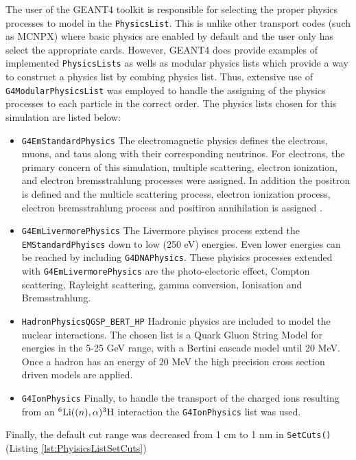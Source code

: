 The user of the GEANT4 toolkit is responsible for selecting the proper physics processes to model in the \verb+PhysicsList+.
This is unlike other transport codes (such as MCNPX) where basic physics are enabled by default and the user only has select the appropriate cards.
However, GEANT4 does provide examples of implemented \verb+PhysicsLists+ as wells as modular physics lists which provide a way to construct a physics list by combing physics list.
Thus, extensive use of \verb+G4ModularPhysicsList+ was employed to handle the assigning of the physics processes to each particle in the correct order.
The physics lists chosen for this simulation are listed below:
\begin{itemize}
    \item \verb+G4EmStandardPhysics+ The electromagnetic physics defines the electrons, muons, and taus along with their corresponding neutrinos. For electrons, the primary concern of this simulation, multiple scattering, electron ionization, and electron bremsstrahlung processes were assigned.  In addition the positron is defined and the multicle scattering process, electron ionization process, electron bremsstrahlung process and positiron annihilation is assigned \cite{cern_physics_2012}.
    \item \verb+G4EmLivermorePhysics+ The Livermore phyiscs process extend the \verb+EMStandardPhyiscs+ down to low (250 eV) energies. Even lower energies can be reached by including \verb+G4DNAPhysics+. These phyisics processes extended with \verb+G4EmLivermorePhysics+ are the photo-electoric effect, Compton scattering, Rayleight scattering, gamma conversion, Ionisation and Bremsstrahlung\cite{cern_physics_2012}. 
    \item \verb+HadronPhysicsQGSP_BERT_HP+ Hadronic physics are included to model the nuclear interactions. The chosen list is a Quark Gluon String Model for energies in the 5-25 GeV range, with a Bertini cascade model until 20 MeV.  Once a hadron has an energy of 20 MeV the high precision cross section driven models are applied\cite{cern_reference_2008}.
    \item \verb+G4IonPhysics+ Finally, to handle the transport of the charged ions resulting from an ${}^6\text{Li}(\text(n),\alpha){}^{3}\text{H}$ interaction the \verb+G4IonPhysics+ list was used.
\end{itemize}

Finally, the default cut range was decreased from 1 cm to 1 nm in \verb+SetCuts()+ (Listing \ref{lst:PhyisicsListSetCuts}) 

